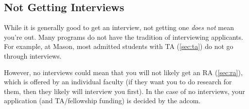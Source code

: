 \documentclass[oneside,11pt,dvipsnames]{book}
\begin{document}
\subsection{Not Getting Interviews}\label{sec:no-interview}
While it is generally good to get an interview, not getting one \emph{does not} mean you're out.  Many programs do not have the tradition of interviewing applicants. For example, at Mason, most admitted students with TA (\autoref{sec:ta}) do not go through interviews.

However, no interviews could mean that you will not likely get an RA (\autoref{sec:ra}), which is offered by an individual faculty (if they want you to do research for them, then they likely will interview you first).  In the case of no interviews, your application (and TA/fellowship funding) is decided by the adcom.









\end{document}
